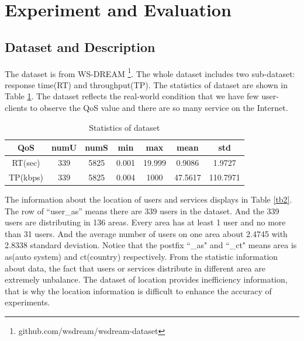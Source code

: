 \documentclass[conference]{IEEEtran}
\begin{document}
\section{Experiment and Evaluation}\label{S-EE}
\subsection{Dataset and Description}
The dataset is from WS-DREAM \footnote{github.com/wsdream/wsdream-dataset}. The whole dataset includes two sub-dataset: response time(RT) and throughput(TP). The statistics of dataset are shown in Table \ref{tb1}. The dataset reflects the real-world condition that we have few user-clients to observe the QoS value and there are so many service on the Internet. 
\begin{table}[H]
\begin{threeparttable}
\caption{Statistics of dataset}
\label{tb1}
\begin{tabular}{c||c|c|c|c|c|c} 
\hline 
QoS & numU & numS & min & max & mean & std \\ 
\hline 
RT(sec) & 339   & 5825  & 0.001 & 19.999 & 0.9086 & 1.9727 \\ 
\hline 
TP(kbps) & 339   & 5825  & 0.004 & 1000  & 47.5617 & 110.7971  \\ 
\hline 
\end{tabular} 
\end{threeparttable}
\end{table}

\par The information about the location of users and services displays in Table \ref{tb2}. The row of ``user\_as'' means there are 339 users in the dataset. And the 339 users are distributing in 136 areas. Every area has at least 1 user and no more than 31 users. And the average number of users on one area about 2.4745 with 2.8338 standard deviation. Notice that the postfix ``\_as" and ``\_ct" means area is as(auto system) and ct(country) respectively. From the statistic information about data, the fact that users or services distribute in different area are extremely unbalance. The dataset of location provides inefficiency information, that is why the location information is difficult to enhance the accuracy of experiments.
\end{document}
